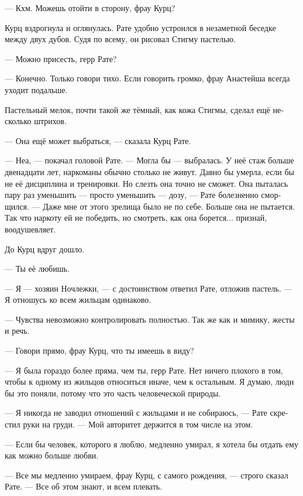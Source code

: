 \documentclass[a4paper,12pt,fleqn]{book}\usepackage{polyglossia}\setdefaultlanguage[babelshorthands=true]{russian}\setotherlanguage{english}\defaultfontfeatures{Ligatures=TeX,Mapping=tex-text}\usepackage{xcolor}\newcommand{\ml}[3]{#2}
\begin{document}
--- Кхм.
Можешь отойти в сторону, фрау Курц?

Курц вздрогнула и оглянулась.
Рате удобно устроился в незаметной беседке между двух дубов.
Судя по всему, он рисовал Стигму пастелью.

--- Можно присесть, герр Рате?

--- Конечно.
Только говори тихо.
Если говорить громко, фрау Анастейша всегда уходит подальше.

Пастельный мелок, почти такой же тёмный, как кожа Стигмы, сделал ещё несколько штрихов.

\ml{$0$}
{--- Она ещё может выбраться, --- сказала Курц Рате.}
{``She still can get clean,'' Kurz said to Rate.}

\ml{$0$}
{--- Неа, --- покачал головой Рате.}
{``Nah,'' Rate shook his head.}
\ml{$0$}
{--- Могла бы --- выбралась.}
{``She would've if she could.}
У неё стаж больше двенадцати лет, наркоманы обычно столько не живут.
Давно бы умерла, если бы не её дисциплина и тренировки.
Но слезть она точно не сможет.
Она пыталась пару раз уменьшить --- просто уменьшить --- дозу, --- Рате болезненно сморщился.
--- Даже мне от этого зрелища было не по себе.
Больше она не пытается.
Так что наркоту ей не победить, но смотреть, как она борется... признай, воодушевляет.

До Курц вдруг дошло.

\ml{$0$}
{--- Ты её любишь.}
{``You love her.''}

--- Я --- хозяин Ночлежки, --- с достоинством ответил Рате, отложив пастель.
--- Я отношусь ко всем жильцам одинаково.

--- Чувства невозможно контролировать полностью.
Так же как и мимику, жесты и речь.

--- Говори прямо, фрау Курц, что ты имеешь в виду?

--- Я была гораздо более пряма, чем ты, герр Рате.
Нет ничего плохого в том, чтобы к одному из жильцов относиться иначе, чем к остальным.
Я думаю, люди бы это поняли, потому что это часть человеческой природы.

--- Я никогда не заводил отношений с жильцами и не собираюсь, --- Рате скрестил руки на груди.
--- Мой авторитет держится в том числе на этом.

\ml{$0$}
{--- Если бы человек, которого я люблю, медленно умирал, я хотела бы отдать ему как можно больше любви.}
{``If the one I love was slowly dying, I'd give them as much love as I could.''}

\ml{$0$}
{--- Все мы медленно умираем, фрау Курц, с самого рождения, --- строго сказал Рате.}
{``We all are slowly dying, frau Kurz, from the very birth,'' Rate strictly said.}
\ml{$0$}
{--- Все об этом знают, и всем плевать.}
{``Everybody knows, and nobody gives a fuck.''}
\end{document}
